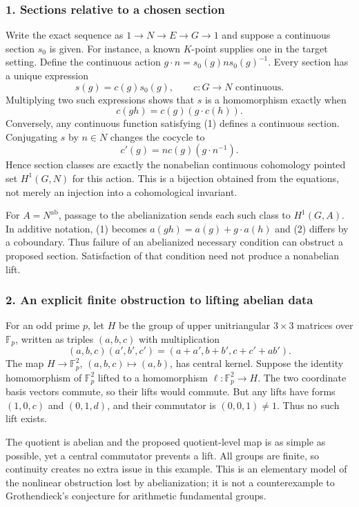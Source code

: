 \documentclass[11pt]{article}
\begin{document}
\subsubsection{1. Sections relative to a chosen section}
Write the exact sequence as $1\to N\to E\to G\to1$ and suppose a continuous section $s_0$ is given. For instance, a known $K$-point supplies one in the target setting. Define the continuous action $g\cdot n=s_0(g)ns_0(g)^{-1}$. Every section has a unique expression
\[s(g)=c(g)s_0(g),\qquad c:G\to N\text{ continuous}.\]
Multiplying two such expressions shows that $s$ is a homomorphism exactly when
\[c(gh)=c(g)(g\cdot c(h)).\tag{1}\]
Conversely, any continuous function satisfying (1) defines a continuous section. Conjugating $s$ by $n\in N$ changes the cocycle to
\[c'(g)=n c(g)(g\cdot n^{-1}).\tag{2}\]
Hence section classes are exactly the nonabelian continuous cohomology pointed set $H^1(G,N)$ for this action. This is a bijection obtained from the equations, not merely an injection into a cohomological invariant.

For $A=N^{\mathrm{ab}}$, passage to the abelianization sends each such class to $H^1(G,A)$. In additive notation, (1) becomes $a(gh)=a(g)+g\cdot a(h)$ and (2) differs by a coboundary. Thus failure of an abelianized necessary condition can obstruct a proposed section. Satisfaction of that condition need not produce a nonabelian lift.

\subsubsection{2. An explicit finite obstruction to lifting abelian data}
For an odd prime $p$, let $H$ be the group of upper unitriangular $3\times3$ matrices over $\mathbb F_p$, written as triples $(a,b,c)$ with multiplication
\[(a,b,c)(a',b',c')=(a+a',b+b',c+c'+ab').\]
The map $H\to\mathbb F_p^2$, $(a,b,c)\mapsto(a,b)$, has central kernel. Suppose the identity homomorphism of $\mathbb F_p^2$ lifted to a homomorphism $\ell:\mathbb F_p^2\to H$. The two coordinate basis vectors commute, so their lifts would commute. But any lifts have forms $(1,0,c)$ and $(0,1,d)$, and their commutator is $(0,0,1)\ne1$. Thus no such lift exists.

The quotient is abelian and the proposed quotient-level map is as simple as possible, yet a central commutator prevents a lift. All groups are finite, so continuity creates no extra issue in this example. This is an elementary model of the nonlinear obstruction lost by abelianization; it is not a counterexample to Grothendieck's conjecture for arithmetic fundamental groups.
\end{document}
